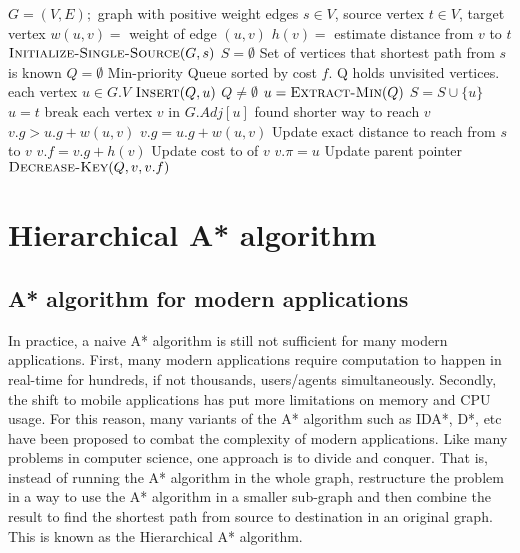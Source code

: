 \documentclass{article}
\begin{document}
\begin{codebox}
\li \Comment $G = (V,E);$ graph with positive weight edges
\li \Comment $s \in V$, source vertex
\li \Comment $t \in V$, target vertex
\li \Comment $w(u,v) = $ weight of edge $(u,v)$
\li \Comment $h(v) = $ estimate distance from $v$ to $t$  
\li
\li $\textsc{Initialize-Single-Source}(G,s)$
\li $S = \emptyset$ \hspace{0.5cm}\Comment Set of vertices that shortest path from $s$ is known  
\li $Q = \emptyset$ \hspace{0.5cm}\Comment Min-priority Queue sorted by cost $f$.
\li                 \hspace{1.5cm}\Comment Q holds unvisited vertices.
\li \For each vertex $u \in G.V$
\li     \Do
            $\textsc{Insert}(Q,u)$
        \End
\li \While $Q \neq \emptyset$
\li     \Do
            $u = \textsc{Extract-Min}(Q)$
\li         $S = S \cup \{u\}$
\li     \If $u = t$
\li         \Do 
                break 
\li         \End
\li     \For each vertex $v$ in $G.Adj[u]$
\li         \Do
                \Comment found shorter way to reach $v$
\li             \If $v.g > u.g + w(u,v)$
\li                 \Do
                        $v.g = u.g + w(u,v)$    \hspace{0.5cm}\Comment Update exact                    distance to reach from $s$ to $v$
\li                     $v.f = v.g + h(v)$      \hspace{0.9cm}\Comment Update cost to                                               of $v$ 
\li                     $v.\pi = u$             \hspace{2.2cm}\Comment Update parent pointer
\li                     $\textsc{Decrease-Key}(Q,v,v.f)$
                    \End
            \End
        \End
\end{codebox}


\section{Hierarchical A* algorithm}
\subsection{A* algorithm for modern applications}
In practice, a naive A* algorithm is still not sufficient for many modern applications. First, many modern applications require computation to happen in real-time for hundreds, if not thousands, users/agents simultaneously\cite{Botea2004NearOH}. Secondly, the shift to mobile applications has put more limitations on memory and CPU usage\cite{Botea2004NearOH}.
For this reason, many variants of the A* algorithm such as IDA*, D*, etc have been proposed to combat the complexity of modern applications. Like many problems in computer science, one approach is to divide and conquer. That is, instead of running the A* algorithm in the whole graph, restructure the problem in a way to use the A* algorithm in a smaller sub-graph and then combine the result to find the shortest path from source to destination in an original graph. This is known as the Hierarchical A* algorithm.
\end{document}
